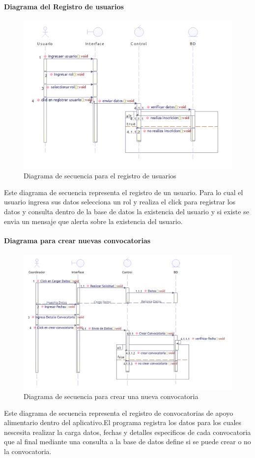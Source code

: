 \paragraph{Diagrama del Registro de usuarios}
\begin{figure}[H]
	\centering
	\includegraphics[width=0.8\linewidth]{parte2/imgs/DiagramaSecuencia/RegUsu}
	\caption[Diagrama de secuencia Registrar Usuario]{Diagrama de secuencia para el registro de usuarios}
	\label{fig:diagramadesecuencia2}
\end{figure}

Este diagrama de secuencia representa el registro de un usuario. Para lo cual el usuario ingresa sus datos selecciona un rol y realiza el click para registrar los datos y consulta dentro de la base de datos la existencia del usuario y si existe se envia un mensaje que alerta sobre la existencia del usuario. 



\paragraph{Diagrama para crear nuevas convocatorias}
\begin{figure}[H]
	\centering
	\includegraphics[width=0.8\linewidth]{parte2/imgs/DiagramaSecuencia/SecCrearConv}
	\caption[Diagrama de secuencia Crear convocatoria]{Diagrama de secuencia para crear una nueva convocatoria}
	\label{fig:diagramadesecuencia5}
\end{figure}
Este diagrama de secuencia representa el registro de convocatorias de apoyo alimentario dentro del aplicativo.El programa registra los datos para los cuales nescesita realizar la carga  datos, fechas y detalles especificos de cada convocatoria que al final mediante una consulta a la base de datos define si se puede crear o no la convocatoria.


